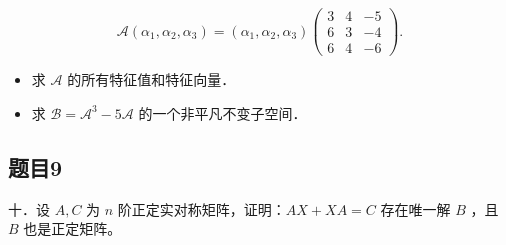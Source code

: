 \documentclass{article}
\begin{document}
\[
\mathcal{A}\left(\alpha_{1}, \alpha_{2}, \alpha_{3}\right)=\left(\alpha_{1}, \alpha_{2}, \alpha_{3}\right)\left(\begin{array}{ccc}
3 & 4 & -5 \\
6 & 3 & -4 \\
6 & 4 & -6
\end{array}\right) .
\]

\begin{itemize}
  \item[（1）] 求 \(\mathcal{A}\) 的所有特征值和特征向量．
  \item[（2）] 求 \(\mathcal{B}=\mathcal{A}^{3}-5 \mathcal{A}\) 的一个非平凡不变子空间．
\end{itemize}

\subsection{题目9}
十．设 \(A, C\) 为 \(n\) 阶正定实对称矩阵，证明：\(A X+X A=C\) 存在唯一解 \(B\) ，且 \(B\) 也是正定矩阵。
\end{document}
